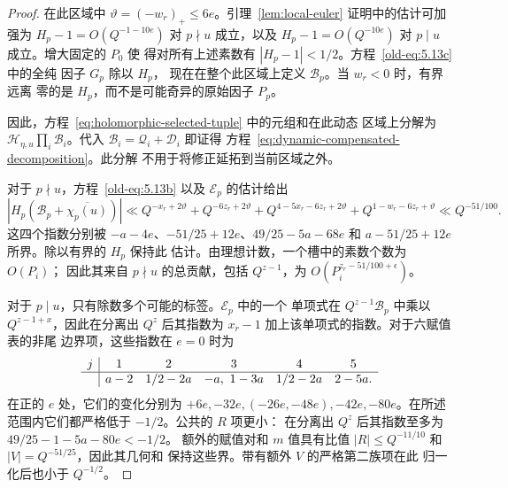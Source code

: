 \documentclass[11pt,a4paper]{article}
\numberwithin{equation}{section}
\numberwithin{figure}{section}
\theoremstyle{definition}
\theoremstyle{remark}
\begin{document}
\begin{proof}
在此区域中 $\vartheta=(-w_r)_+\le6e$。引理~\ref{lem:local-euler}
证明中的估计可加强为
$H_p-1=O(Q^{-1-10e})$ 对 $p\nmid u$ 成立，以及
$H_p-1=O(Q^{-10e})$ 对 $p\mid u$ 成立。增大固定的 $P_0$ 使
得对所有上述素数有 $|H_p-1|<1/2$。方程~\eqref{old-eq:5.13c} 中的全纯
因子 $G_p$ 除以 $H_p$，
现在在整个此区域上定义 $\mathcal B_p$。当 $w_r<0$ 时，有界远离
零的是 $H_p$，而不是可能奇异的原始因子 $P_p$。

因此，方程~\eqref{eq:holomorphic-selected-tuple} 中的元组和在此动态
区域上分解为 $\mathcal H_{\eta,u}\prod_i\mathcal B_i$。代入
$\mathcal B_i=\mathcal Q_i+\mathcal D_i$ 即证得
方程~\eqref{eq:dynamic-compensated-decomposition}。此分解
不用于将修正延拓到当前区域之外。

对于 $p\nmid u$，方程~\eqref{old-eq:5.13b} 以及
$\mathcal E_p$ 的估计给出
\[
 |H_p(\mathcal B_p+\overline{\chi_p(u)})|
 \ll Q^{-x_r+2\vartheta}+Q^{-6z_r+2\vartheta}
       +Q^{4-5x_r-6z_r+2\vartheta}
       +Q^{1-w_r-6z_r+\vartheta}
 \ll Q^{-51/100}.
\]
这四个指数分别被
$-a-4e$、$-51/25+12e$、$49/25-5a-68e$ 和
$a-51/25+12e$ 所界。除以有界的 $H_p$ 保持此
估计。由理想计数，一个槽中的素数个数为 $O(P_i)$；
因此其来自 $p\nmid u$ 的总贡献，包括
$Q^{z-1}$，为 $O(P_i^{z_r-51/100+\epsilon})$。

对于 $p\mid u$，只有除数多个可能的标签。$\mathcal E_p$ 中的一个
单项式在
$Q^{z-1}\mathcal B_p$ 中乘以 $Q^{z-1+x}$，因此在分离出 $Q^z$ 后其指数为
$x_r-1$ 加上该单项式的指数。对于六赋值表的非尾
边界项，这些指数在
$e=0$ 时为
\[
\begin{array}{c|ccccc}
 j&1&2&3&4&5\\\hline
 &a-2&1/2-2a&-a,\ 1-3a&1/2-2a&2-5a.
\end{array}
\]
在正的 $e$ 处，它们的变化分别为
$+6e,-32e,(-26e,-48e),-42e,-80e$。在所述范围内它们都严格低于
$-1/2$。公共的 $R$ 项更小：
在分离出 $Q^z$ 后其指数至多为 $49/25-1-5a-80e<-1/2$。
额外的赋值对和 $m$ 值具有比值
$|R|\le Q^{-11/10}$ 和 $|V|=Q^{-51/25}$，因此其几何和
保持这些界。带有额外 $V$ 的严格第二族项在此
归一化后也小于 $Q^{-1/2}$。


\end{proof}
\end{document}
